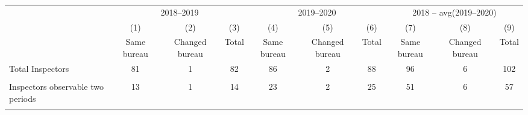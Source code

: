 {
\def\sym#1{\ifmmode^{#1}\else\(^{#1}\)\fi}
\begin{tabular}{l*{9}{c}}
\toprule
            &\multicolumn{3}{c}{2018–2019}                                    &\multicolumn{3}{c}{2019–2020}                                    &\multicolumn{3}{c}{2018 – avg(2019–2020)}                        \\\cmidrule(lr){2-4}\cmidrule(lr){5-7}\cmidrule(lr){8-10}
            &\multicolumn{1}{c}{(1)}&\multicolumn{1}{c}{(2)}&\multicolumn{1}{c}{(3)}&\multicolumn{1}{c}{(4)}&\multicolumn{1}{c}{(5)}&\multicolumn{1}{c}{(6)}&\multicolumn{1}{c}{(7)}&\multicolumn{1}{c}{(8)}&\multicolumn{1}{c}{(9)}\\
            &\multicolumn{1}{c}{Same bureau}&\multicolumn{1}{c}{Changed bureau}&\multicolumn{1}{c}{Total}&\multicolumn{1}{c}{Same bureau}&\multicolumn{1}{c}{Changed bureau}&\multicolumn{1}{c}{Total}&\multicolumn{1}{c}{Same bureau}&\multicolumn{1}{c}{Changed bureau}&\multicolumn{1}{c}{Total}\\
\midrule
Total Inspectors&          81         &           1         &          82         &          86         &           2         &          88         &          96         &           6         &         102         \\
            &                     &                     &                     &                     &                     &                     &                     &                     &                     \\
Inspectors observable two periods&          13         &           1         &          14         &          23         &           2         &          25         &          51         &           6         &          57         \\
            &                     &                     &                     &                     &                     &                     &                     &                     &                     \\
\bottomrule
\end{tabular}
}
